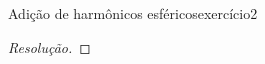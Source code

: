 \begin{exercício}{Adição de harmônicos esféricos}{exercício2}
\begin{center}
\begin{tikzpicture}[scale=1.2,tdplot_main_coords]
\end{tikzpicture}

    \end{center}
\end{exercício}
\begin{proof}[Resolução]

\end{proof}
